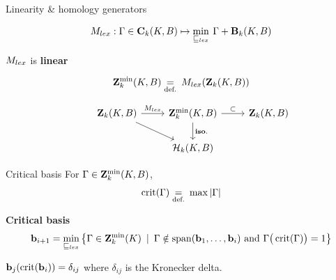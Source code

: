 \begin{frame}{Linearity \& homology generators}
	\small
	
	\[
		M_{lex} : \Gamma \in \mathbf{C}_k(K, B) \mapsto \min_{\sqsubseteq_{lex}} \: \Gamma + \mathbf{B}_{k}(K, B)
	\]
	
	$M_{lex}$ is \textbf{linear}
	
	\[
	\mathbf{Z}^{\min}_k(K,B) \underset{\text{def.}}{=} \: M_{lex}(\mathbf{Z}_k(K, B))
	\]
	
	\[
		\begin{tikzcd}[ampersand replacement=\&]
			\& \Zchains_k(K, B) \ar{dr} \arrow{r}{\Mlex} \& \ZchainMin_k (K,B) \ar{d}{\mathbf{iso.}} \arrow{r}{\subset } \& \Zchains_k(K, B) \\
			\&\& \Homol_k(K,B) 
		\end{tikzcd}
	\]
\end{frame}

\begin{frame}{Critical basis}
	\small	
	For $\Gamma \in \mathbf{Z}^{\min}_k(K,B)$,
	\[
	\operatorname{crit}(\Gamma) \underset{\text{def.}}{=} \: \max | \Gamma |
	\]
	
	\pause
	\textbf{Critical basis}
	\begin{equation*}
		\mathbf{b}_{i+1} = \min_{\sqsubseteq_{lex}} \left\{  \Gamma \in  \mathbf{Z}^{\min}_k(K) \: \mid \:   \Gamma \notin \operatorname{span}(  \mathbf{b}_1, \ldots , \mathbf{b}_i ) \text{ and } \Gamma\big(\operatorname{crit}(\Gamma)\big)= 1 \right\}
	\end{equation*}
		
	\pause
	\begin{center}
		$\mathbf{b}_j ( \operatorname{crit}( \mathbf{b}_i ) ) =  \delta_{ij}$ where $\delta_{ij}$ is the Kronecker delta. 
	\end{center}

\end{frame}

